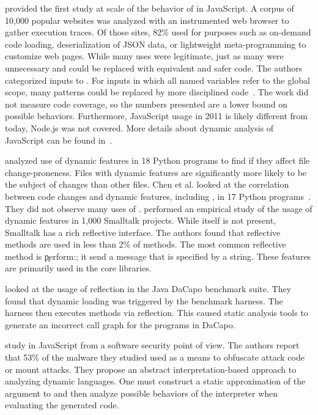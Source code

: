 \documentclass[screen,acmsmall]{acmart}%
\begin{document}
\citet{ecoop11} provided the first study at scale of the behavior of \eval in
JavaScript. A corpus of 10,000 popular websites was analyzed with an
instrumented web browser to gather execution traces. Of those sites, 82\% used
\eval for purposes such as on-demand code loading, deserialization of JSON data,
or lightweight meta-programming to customize web pages. While many uses were
legitimate, just as many were unnecessary and could be replaced with equivalent
and safer code. The authors categorized inputs to \eval. For inputs in
which all named variables refer to the global scope, many patterns could be
replaced by more disciplined code~\cite{oopsla12b, moller12}. The work did not
measure code coverage, so the numbers presented are a lower bound on possible
behaviors. Furthermore, JavaScript usage in 2011 is likely different from today,
\eg Node.js was not covered. More details about dynamic analysis of JavaScript
can be found in~\cite{liang}.

\citet{wang} analyzed use of dynamic features in 18 Python programs to find if
they affect file change-proneness. Files with dynamic features are significantly
more likely to be the subject of changes than other files. Chen et al. looked
at the correlation between code changes and dynamic features, including \eval,
in 17 Python programs~\cite{chen}. They did not observe many uses of \eval.
\citet{oscar} performed an empirical study of the usage of dynamic features in
1,000 Smalltalk projects. While \eval itself is not present, Smalltalk has a
rich reflective interface. The authors found that reflective methods are used in less
than 2\% of methods. The most common reflective method is \c{perform:}; it send
a message that is specified by a string. These features are primarily used in the
core libraries.

\citet{bodden} looked at the usage of reflection in the Java DaCapo benchmark suite.
They found that dynamic loading was triggered by the benchmark harness. The
harness then executes methods via reflection. This caused static analysis tools
to generate an incorrect call graph for the programs in DaCapo.

\citet{Arceri21} study \eval in JavaScript from a software security point of
view. The authors report that 53\% of the malware they studied used \eval as a
means to obfuscate attack code or mount attacks. They propose an abstract
interpretation-based approach to analyzing dynamic languages. One must construct
a static approximation of the argument to \eval and then analyze possible
behaviors of the interpreter when evaluating the generated code.
\end{document}
